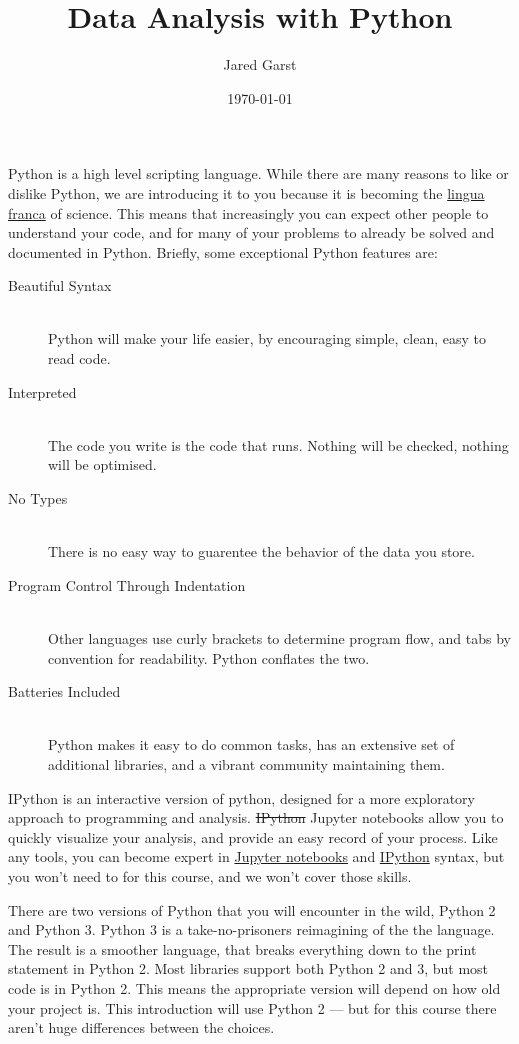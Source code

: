 \documentclass[justified, nobib]{tufte-handout}
\title{Data Analysis with Python}
\author{Jared Garst}
\date{\today} %
\newcommand{\ipythonTutorialLink}
  {http://ipython.readthedocs.org/en/stable/interactive/index.html}
\newcommand{\jupyterInfoLink}
  {http://jupyter-notebook.readthedocs.org/en/latest/notebook.html\#basic-workflow}
\newcommand{\linguaFrancaLink}{http://en.wikipedia.org/wiki/Lingua_franca}
\begin{document}
\maketitle
\bigskip

\noindent
Python is a high level scripting language. While there are many reasons to like
or dislike Python, we are introducing it to you because it is becoming the
\href{\linguaFrancaLink}{lingua franca} of
science. This means that increasingly you can expect other people to understand
your code, and for many of your problems to already be solved and documented in
Python. Briefly, some exceptional Python features are:

\begin{description}
\item[Beautiful Syntax] \hfill \\
  Python will make your life easier, by encouraging simple, clean, easy to read
  code.
\item[Interpreted] \hfill \\
  The code you write is the code that runs. Nothing will be checked, nothing
  will be optimised.
\item[No Types] \hfill \\
  There is no easy way to guarentee the behavior of the data you store.
\item[Program Control Through Indentation] \hfill \\
  Other languages use curly brackets \pythoninline{{}} to determine program flow, and tabs by
  convention for readability. Python conflates the two.
\item[Batteries Included] \hfill \\
  Python makes it easy to do common tasks, has an extensive set of additional
  libraries, and a vibrant community maintaining them.
\end{description}

\noindent
IPython is an interactive version of python, designed for a more exploratory
approach to programming and analysis.
\sout{IPython} Jupyter notebooks allow you to quickly visualize your analysis,
and provide an easy record of your process.
Like any tools, you can become expert in
\href{\jupyterInfoLink}{Jupyter notebooks} and
\href{\ipythonTutorialLink}{IPython} syntax, but you won't need to for this
course, and we won't cover those skills.

\smallskip
\noindent
There are two versions of Python that you will encounter in the wild, Python 2
and Python 3. Python 3 is a take-no-prisoners reimagining of the the
language.
The result is a smoother language, that breaks everything down to the print
statement in Python 2.
Most libraries support both Python 2 and 3, but most code is in Python 2.
This means the appropriate version will depend on how old your project is.
This introduction will use Python 2 --- but for this course there aren't huge
differences between the choices.
\end{document}
